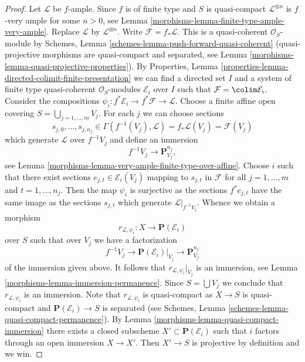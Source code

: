 \begin{proof}

Let $\mathcal{L}$ be $f$-ample. Since $f$ is of finite type and $S$ is
quasi-compact $\mathcal{L}^{\otimes n}$ is $f$-very ample for some $n > 0$, see
Lemma \ref{morphisms-lemma-finite-type-ample-very-ample}.
Replace $\mathcal{L}$ by $\mathcal{L}^{\otimes n}$.
Write $\mathcal{F} = f_*\mathcal{L}$. This is a quasi-coherent
$\mathcal{O}_S$-module by
Schemes, Lemma \ref{schemes-lemma-push-forward-quasi-coherent}
(quasi-projective morphisms are quasi-compact and
separated, see Lemma \ref{morphisms-lemma-quasi-projective-properties}). By
Properties, Lemma \ref{properties-lemma-directed-colimit-finite-presentation}
we can find a directed set $I$ and a system of
finite type quasi-coherent $\mathcal{O}_S$-modules $\mathcal{E}_i$
over $I$ such that $\mathcal{F} = \colim \mathcal{E}_i$.
Consider the compositions
$\psi_i : f^*\mathcal{E}_i \to f^*\mathcal{F} \to \mathcal{L}$.
Choose a finite affine open covering $S = \bigcup_{j = 1, \ldots, m} V_j$.
For each $j$ we can choose sections
$$
s_{j, 0}, \ldots, s_{j, n_j} \in
\Gamma(f^{-1}(V_j), \mathcal{L}) = f_*\mathcal{L}(V_j) = \mathcal{F}(V_j)
$$
which generate $\mathcal{L}$ over $f^{-1}V_j$ and define an immersion
$$
f^{-1}V_j \longrightarrow \mathbf{P}^{n_j}_{V_j},
$$
see Lemma \ref{morphisms-lemma-very-ample-finite-type-over-affine}.
Choose $i$ such that there exist sections $e_{j, t} \in \mathcal{E}_i(V_j)$
mapping to $s_{j, t}$ in $\mathcal{F}$ for all $j = 1, \ldots, m$ and
$t = 1, \ldots, n_j$. Then the map $\psi_i$ is surjective
as the sections $f^*e_{j, t}$ have the same image as the sections $s_{j, t}$
which generate $\mathcal{L}|_{f^{-1}V_j}$. Whence we obtain a morphism
$$
r_{\mathcal{L}, \psi_i} : X \longrightarrow \mathbf{P}(\mathcal{E}_i)
$$
over $S$ such that over $V_j$ we have a factorization
$$
f^{-1}V_j \to \mathbf{P}(\mathcal{E}_i)|_{V_j} \to \mathbf{P}^{n_j}_{V_j}
$$
of the immersion given above. It follows that $r_{\mathcal{L}, \psi_i}|_{V_j}$
is an immersion, see Lemma \ref{morphisms-lemma-immersion-permanence}.
Since $S = \bigcup V_j$ we conclude that $r_{\mathcal{L}, \psi_i}$
is an immersion.
Note that $r_{\mathcal{L}, \psi_i}$ is quasi-compact as
$X \to S$ is quasi-compact and $\mathbf{P}(\mathcal{E}_i) \to S$ is separated
(see Schemes, Lemma \ref{schemes-lemma-quasi-compact-permanence}).
By Lemma \ref{morphisms-lemma-quasi-compact-immersion} there exists a closed
subscheme $X' \subset \mathbf{P}(\mathcal{E}_i)$ such that $i$ factors
through an open immersion $X \to X'$. Then $X' \to S$ is projective
by definition and we win.
\end{proof}

